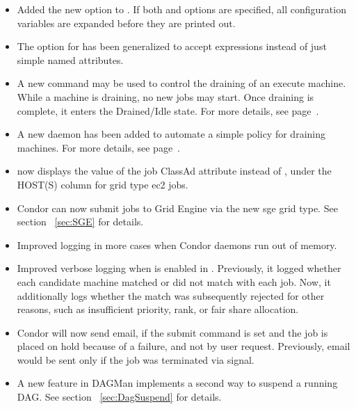 \begin{itemize}
\item Added the new  option to .
If both  and  options are specified,
all configuration variables are expanded before they are printed out.

\item The  option for  has been generalized to
accept expressions instead of just simple named attributes.

\item A new command  may be used to control the draining
of an execute machine.  While a machine is draining, no new jobs may
start.  Once draining is complete, it enters the Drained/Idle state.
For more details, see page~\pageref{man-condor-drain}.

\item A new daemon  has been added to automate a simple
policy for draining machines.  For more details, see
page~\pageref{sec:Config-defrag}.

\item  {}  now displays the value of the job ClassAd
attribute  instead of
\Expr{[????????????????]},
under the HOST(S) column for grid type ec2 jobs.

\item Condor can now submit jobs to Grid Engine via the new sge grid type.
See section ~\ref{sec:SGE} for details.

\item Improved logging in more cases when Condor daemons run out of memory.

\item Improved verbose logging when  is enabled in
.  Previously, it logged whether each
candidate machine matched or did not match with each job.  Now, it
additionally logs whether the match was subsequently rejected for
other reasons, such as insufficient priority, rank, or fair share
allocation.

\item Condor will now send email,
if the submit command  is set and
the job is placed on hold because of a failure, and not by user request.
Previously, email would be sent only if the job was terminated via signal.

\item A new feature in DAGMan implements a second way to suspend a running DAG.
See section ~\ref{sec:DagSuspend} for details.


\end{itemize}
